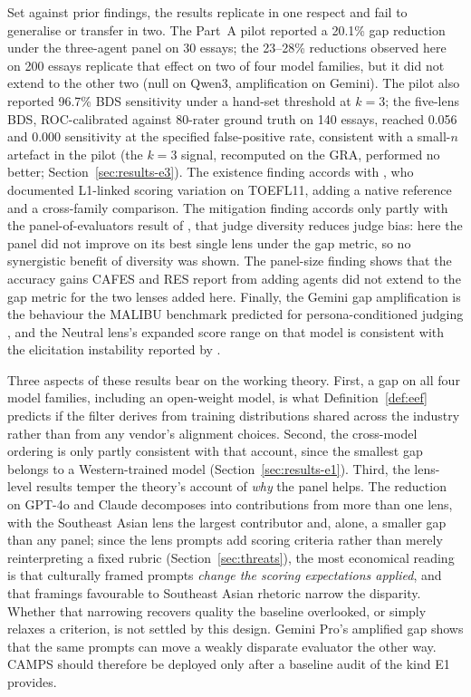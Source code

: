 Set against prior findings, the results replicate in one respect and
fail to generalise or transfer in two. The Part~A pilot reported a
20.1\% gap reduction under the three-agent panel on 30 essays; the
23--28\% reductions observed here on 200 essays replicate that
effect on two of four model families, but it did not extend to the
other two (null on Qwen3, amplification on Gemini). The pilot also reported 96.7\% BDS sensitivity under a
hand-set threshold at $k = 3$; the five-lens BDS, ROC-calibrated
against 80-rater ground truth on 140 essays, reached 0.056 and
0.000 sensitivity at the specified false-positive rate, consistent with a
small-$n$ artefact in the pilot (the $k = 3$ signal, recomputed on
the GRA, performed no better; Section~\ref{sec:results-e3}). The existence finding accords with
\citet{gayed2026firstlanguage}, who documented L1-linked scoring
variation on TOEFL11, adding a native reference and a cross-family
comparison. The mitigation
finding accords only partly with the panel-of-evaluators result of
\citet{verga2024replacing}, that judge diversity reduces judge bias:
here the panel did not improve on its best single lens under the gap
metric, so no synergistic benefit of diversity was shown. The
panel-size finding shows that the accuracy gains CAFES and RES
report from adding agents \citep{su2025cafes, jang2025roundtable}
did not extend to the gap metric for the two lenses added here. Finally, the Gemini gap
amplification is the behaviour the MALIBU benchmark predicted for
persona-conditioned judging \citep{mirza2025malibu}, and the Neutral
lens's expanded score range on that model is consistent with the
elicitation instability reported by \citet{khan2025randomness}.

Three aspects of these results bear on the working theory. First, a
gap on all four model families, including an open-weight model, is
what Definition~\ref{def:eef} predicts if the filter derives from
training distributions shared across the industry rather than from
any vendor's alignment choices. Second, the cross-model ordering is
only partly consistent with that account, since the smallest gap
belongs to a Western-trained model (Section~\ref{sec:results-e1}).
Third, the lens-level results temper the theory's account of
\emph{why} the panel helps. The reduction on GPT-4o and Claude decomposes into contributions
from more than one lens, with the Southeast Asian lens the largest
contributor and, alone, a smaller gap than any panel; since the lens
prompts add scoring criteria rather than merely reinterpreting a
fixed rubric (Section~\ref{sec:threats}), the most economical
reading is that culturally framed prompts \emph{change the scoring
expectations applied}, and that framings favourable to Southeast
Asian rhetoric narrow the disparity. Whether that
narrowing recovers quality the baseline overlooked, or simply
relaxes a criterion, is not settled by this design. Gemini Pro's
amplified gap shows that the same prompts can move a weakly
disparate evaluator the other way. CAMPS should therefore be
deployed only after a baseline audit of the kind E1 provides.

